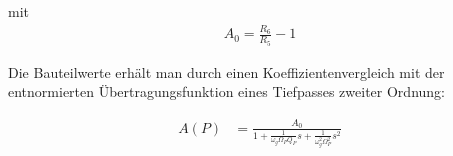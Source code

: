 \documentclass[11pt,twoside,openright]{mpreport}
\begin{document}
mit
\begin{align*}
A_0=\frac{R_6}{R_5}-1
\end{align*}


Die Bauteilwerte erhält man durch einen Koeffizientenvergleich mit der entnormierten
Übertragungsfunktion eines Tiefpasses zweiter Ordnung:

\begin{align*}
A(P)&=\frac{A_0}{1+\frac{1}{\omega_g\Omega_PQ_P}s+\frac{1}{\omega_g^2\Omega_P^2}s^2}
\end{align*}



{}

\end{document}

